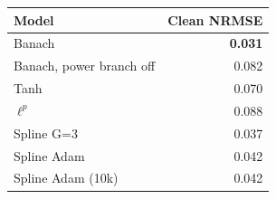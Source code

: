 \begin{tabular}{lr}
\toprule
Model & Clean NRMSE \\
\midrule
Banach & \textbf{0.031} \\
Banach, power branch off & 0.082 \\
Tanh & 0.070 \\
$\ell^p$ & 0.088 \\
Spline G=3 & 0.037 \\
Spline Adam & 0.042 \\
Spline Adam (10k) & 0.042 \\
\bottomrule
\end{tabular}
